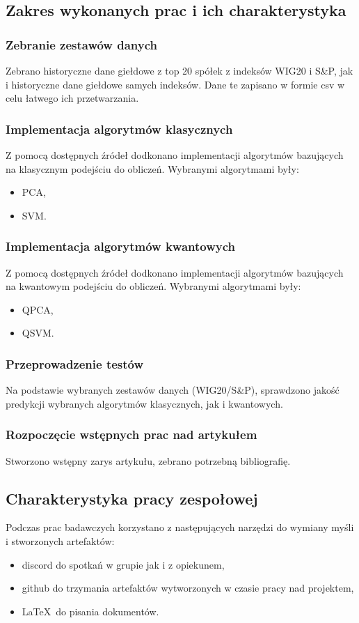 \documentclass[polish,envcountsect,10pt]{article}
\begin{document}
\subsection{Zakres wykonanych prac i ich charakterystyka}

\subsubsection{Zebranie zestawów danych}
Zebrano historyczne dane giełdowe z top 20 spółek z indeksów WIG20 i S\&P, jak i historyczne dane giełdowe samych indeksów.
Dane te zapisano w formie csv w celu łatwego ich przetwarzania.

\subsubsection{Implementacja algorytmów klasycznych}
Z pomocą dostępnych źródeł dodkonano implementacji algorytmów bazujących na klasycznym podejściu do obliczeń. 
Wybranymi algorytmami były:
\begin{itemize}
	\item PCA,
	\item SVM.
\end{itemize}
\subsubsection{Implementacja algorytmów kwantowych}
Z pomocą dostępnych źródeł dodkonano implementacji algorytmów bazujących na kwantowym podejściu do obliczeń. 
Wybranymi algorytmami były:
\begin{itemize}
	\item QPCA,
	\item QSVM.
\end{itemize}
\subsubsection{Przeprowadzenie testów}
Na podstawie wybranych zestawów danych (WIG20/S\&P), sprawdzono jakość predykcji wybranych algorytmów klasycznych, jak i kwantowych.

\subsubsection{Rozpoczęcie wstępnych prac nad artykułem}
Stworzono wstępny zarys artykułu, zebrano potrzebną bibliografię.

\subsection{Charakterystyka pracy zespołowej}
Podczas prac badawczych korzystano z następujących narzędzi do wymiany myśli i stworzonych artefaktów:
\begin{itemize}
	\item discord do spotkań w grupie jak i z opiekunem, 
	\item github do trzymania artefaktów wytworzonych w czasie pracy nad projektem,
	\item \LaTeX ~do pisania dokumentów.
\end{itemize}
\end{document}
